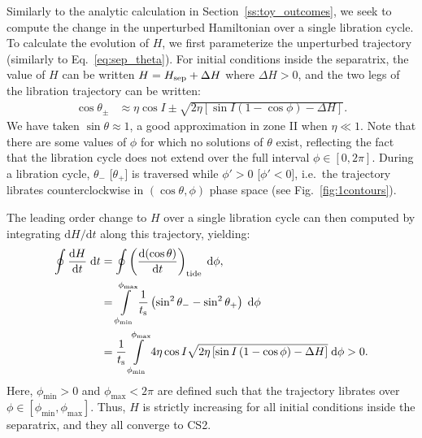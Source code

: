 \documentclass[
        fleqn,
        usenatbib,
    ]{mnras}
\newcommand*{\rd}[2]{\frac{\mathrm{d}#1}{\mathrm{d}#2}}
\newcommand*{\rdil}[2]{\mathrm{d}#1/\mathrm{d}#2}
\newcommand*{\p}[1]{\left(#1\right)}
\newcommand*{\s}[1]{\left[#1\right]}
\begin{document}
Similarly to the analytic calculation in Section~\ref{ss:toy_outcomes}, we seek
to compute the change in the unperturbed Hamiltonian over a single libration
cycle. To calculate the evolution of $H$, we first parameterize the unperturbed
trajectory (similarly to Eq.~\ref{eq:sep_theta}). For initial conditions inside
the separatrix, the value of $H$ can be written $H = H_{\rm sep} + \Delta H$
where $\Delta H > 0$, and the two legs of the libration trajectory can be
written:
\begin{align}
    \cos \theta_{\pm} &\approx
        \eta \cos I \pm \sqrt{2\eta\s{\sin I\p{1 - \cos \phi} - \Delta H}}.
        \label{eq:lib_cycle_toy}
\end{align}
We have taken $\sin \theta \approx 1$, a good approximation in zone II when
$\eta \ll 1$. Note that there are some values of $\phi$ for which no solutions
of $\theta$ exist, reflecting the fact that the libration cycle does not extend
over the full interval $\phi \in [0, 2\pi]$. During a libration cycle,
$\theta_-$ [$\theta_+$] is traversed while $\phi' > 0$ [$\phi' < 0$], i.e.\ the
trajectory librates counterclockwise in $(\cos \theta, \phi)$ phase space (see
Fig.~\ref{fig:1contours}).

The leading order change to $H$ over a single libration cycle can then computed by
integrating $\rdil{H}{t}$ along this trajectory, yielding:
\begin{align}
    \oint \rd{H}{t}\;\mathrm{d}t
        &= \oint \p{\rd{(\cos \theta)}{t}}_{\rm tide}
            \;\mathrm{d}\phi,\nonumber\\
        &= \int\limits_{\phi_{\min}}^{\phi_{\max}}
                \frac{1}{t_{\rm s}}
                \p{\sin^2\theta_- - \sin^2\theta_+} \;\mathrm{d}\phi\nonumber\\
        &= \frac{1}{t_{\rm s}}
            \int\limits_{\phi_{\min}}^{\phi_{\max}}
                4\eta \cos I \sqrt{2\eta\s{\sin I\p{1 - \cos \phi} - \Delta H}}
                \;\mathrm{d}\phi > 0.
\end{align}
Here, $\phi_{\min} > 0$ and $\phi_{\max} < 2\pi$ are defined such that the
trajectory librates over $\phi \in \s{\phi_{\min}, \phi_{\max}}$. Thus, $H$ is
strictly increasing for all initial conditions inside the separatrix, and they
all converge to CS2.

\end{document}
